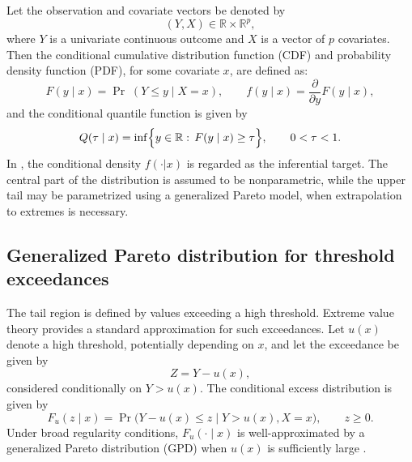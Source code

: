 \documentclass[article]{jss}\usepackage[]{graphicx}\usepackage[]{xcolor}
\begin{document}
Let the observation and covariate vectors be denoted by
\begin{equation*}
(Y,X) \in \mathbb{R}\times \mathbb{R}^p,
\end{equation*}
where $Y$ is a univariate continuous outcome and $X$ is a vector of $p$ covariates.
Then the conditional cumulative distribution function (CDF) and probability density function (PDF), for some covariate $x$, are defined as:
\begin{equation*}
F(y\mid x)=\Pr\;(Y\le y\mid X=x),
\qquad
f(y\mid x)=\frac{\partial}{\partial y}F(y\mid x),
\end{equation*}
and the conditional quantile function is given by
\begin{equation*}
Q(\tau\mid x)=\inf\Bigl\{y\in\mathbb{R}:\,F(y\mid x)\ge \tau\Bigr\},
\qquad 0<\tau<1.
\end{equation*}
In , the conditional density $f(\cdot|x)$ is regarded as the inferential target.
The central part of the distribution is assumed to be nonparametric, while
the upper tail may be parametrized using a generalized Pareto model, when
extrapolation to extremes is necessary.


\subsection{Generalized Pareto distribution for threshold exceedances}
\label{subsec:gpd}

The tail region is defined by values exceeding a high threshold.
Extreme value theory provides a standard approximation for such
exceedances.  Let $u(x)$ denote a high threshold, potentially
depending on $x$, and let the exceedance be given by
\begin{equation*}
Z = Y - u(x),
\end{equation*}
considered conditionally on $Y > u(x)$.  The conditional excess
distribution is given by
\begin{equation*}
F_u(z\mid x) = \Pr\!\bigl(Y-u(x) \le z \mid Y>u(x), X=x\bigr),
\qquad z \ge 0.
\end{equation*}
Under broad regularity conditions, $F_u(\cdot\mid x)$ is
well-approximated by a generalized Pareto distribution (GPD) when
$u(x)$ is sufficiently large
\citep{BalkemaDeHaan1974,Pickands1975,Coles2001}.
\end{document}
